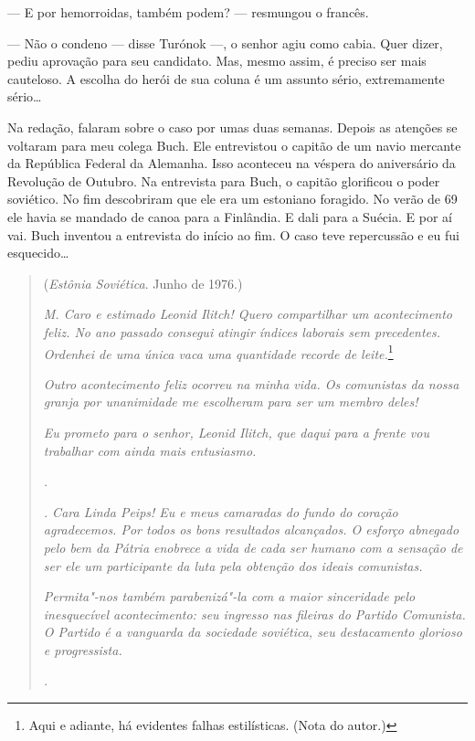 --- E por hemorroidas, também podem? --- resmungou o
francês.

--- Não o condeno --- disse Turónok ---, o senhor
agiu como cabia. Quer dizer, pediu aprovação para seu candidato. Mas,
mesmo assim, é preciso ser mais cauteloso. A escolha do herói de sua
coluna é um assunto sério, extremamente sério\ldots{}

Na redação, falaram sobre o caso por umas duas semanas. Depois as
atenções se voltaram para meu colega Buch. Ele entrevistou o capitão de
um navio mercante da República Federal da Alemanha. Isso aconteceu na
véspera do aniversário da Revolução de Outubro. Na entrevista para Buch,
o capitão glorificou o poder soviético. No fim descobriram que ele era
um estoniano foragido. No verão de 69 ele havia se mandado de canoa para
a Finlândia. E dali para a Suécia. E por aí vai. Buch inventou a
entrevista do início ao fim. O caso teve repercussão e eu fui
esquecido\ldots{}

\movetooddpage
\begin{center}
{}
\end{center}

\begin{quotation}
\begin{flushright}
(\emph{Estônia Soviética}. Junho de 1976.)
\end{flushright}
\vspace{4pt}
\noindent\emph{M. Caro e estimado
Leonid Ilitch! Quero compartilhar um acontecimento feliz. No ano passado
consegui atingir índices laborais sem precedentes. Ordenhei de uma única
vaca uma quantidade recorde de leite.}\footnote{Aqui e adiante, há
  evidentes falhas estilísticas. (Nota do autor.)}

\emph{Outro acontecimento feliz ocorreu na minha vida. Os comunistas da
nossa granja por unanimidade me escolheram para ser um membro deles!}

\emph{Eu prometo para o senhor, Leonid Ilitch, que daqui para a frente
vou trabalhar com ainda mais entusiasmo.}
\begin{flushright}
\emph{.}\\
\end{flushright}
\emph{
. Cara
Linda Peips! Eu e meus camaradas do fundo do coração agradecemos. Por
todos os bons resultados alcançados. O esforço abnegado pelo bem da
Pátria enobrece a vida de cada ser humano com a sensação de ser ele um
participante da luta pela obtenção dos ideais comunistas.}

\emph{Permita"-nos também parabenizá"-la com a maior sinceridade pelo
inesquecível acontecimento: seu ingresso nas fileiras do Partido
Comunista. O Partido é a vanguarda da sociedade soviética, seu
destacamento glorioso e progressista.}
\begin{flushright}
\emph{.}
\end{flushright}
\end{quotation}

